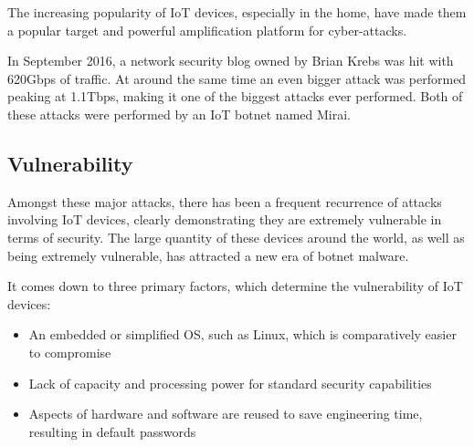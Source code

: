 The increasing popularity of IoT devices, especially in the home, have made them a popular target and powerful amplification platform for cyber-attacks\textsuperscript{\cite{kolias2017ddos}}.

\vspace{0.5cm}

In September 2016, a network security blog owned by Brian Krebs was hit with 620Gbps of traffic. At around the same time an even bigger attack was performed peaking at 1.1Tbps, making it one of the biggest attacks ever performed. Both of these attacks were performed by an IoT botnet named Mirai.

\vspace{0.5cm}

\subsection{Vulnerability}

Amongst these major attacks, there has been a frequent recurrence of attacks involving IoT devices, clearly demonstrating they are extremely vulnerable in terms of security. The large quantity of these devices around the world, as well as being extremely vulnerable, has attracted a new era of botnet malware.

It comes down to three primary factors, which determine the vulnerability of IoT devices:
\begin{itemize}
	\item{An embedded or simplified OS, such as Linux, which is comparatively easier to compromise}
	\item{Lack of capacity and processing power for standard security capabilities}
	\item{Aspects of hardware and software are reused to save engineering time, resulting in default passwords}
\end{itemize}
